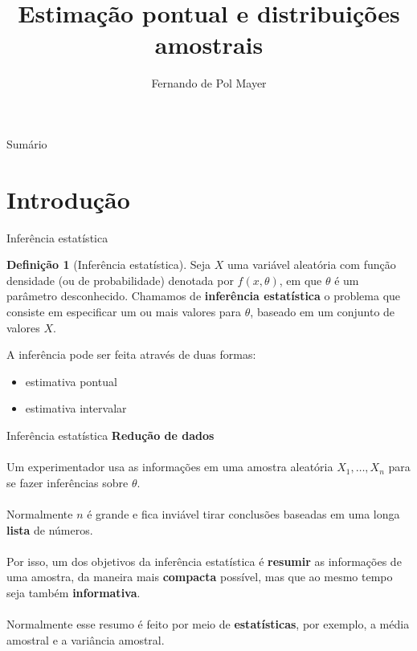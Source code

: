 \documentclass[10pt]{beamer}\usepackage[]{graphicx}\usepackage[]{color}
\title{Estimação pontual e distribuições amostrais}
\author[]{Fernando de Pol Mayer}
\institute[UFPR]{Laboratório de Estatística e Geoinformação (LEG) \\
  Departamento de Estatística (DEST) \\
  Universidade Federal do Paraná (UFPR)}
\date{}
\theoremstyle{definition}
\newtheorem*{mydef}{Definição}
\begin{document}
\begin{frame}
\maketitle
\end{frame}

\begin{frame}{Sumário}
\tableofcontents
\end{frame}

\section[Introdução]{Introdução}

\begin{frame}{Inferência estatística}
\begin{mydef}[Inferência estatística]
  Seja $X$ uma variável aleatória com função densidade (ou de
  probabilidade) denotada por $f(x,\theta)$, em que $\theta$ é um
  parâmetro desconhecido. Chamamos de \textbf{inferência estatística} o
  problema que consiste em especificar um ou mais valores para $\theta$,
  baseado em um conjunto de valores $X$.
  \end{mydef}
  \vspace{1em}
  A inferência pode ser feita através de duas formas:
  \begin{itemize}
  \item estimativa pontual
  \item estimativa intervalar
  \end{itemize}
\end{frame}

\begin{frame}{Inferência estatística}
  \textbf{Redução de dados} \\~\\

  Um experimentador usa as informações em uma amostra aleatória $X_1,
  \ldots, X_n$ para se fazer inferências sobre $\theta$. \\~\\
  Normalmente $n$ é grande e fica inviável tirar conclusões baseadas em
  uma longa \textbf{lista} de números. \\~\\
  Por isso, um dos objetivos da inferência estatística é \textbf{resumir} as
  informações de uma amostra, da maneira mais \textbf{compacta}
  possível, mas que ao mesmo tempo seja também
  \textbf{informativa}. \\~\\
  Normalmente esse resumo é feito por meio de \textbf{estatísticas}, por exemplo,
  a média amostral e a variância amostral.
\end{frame}
\end{document}
